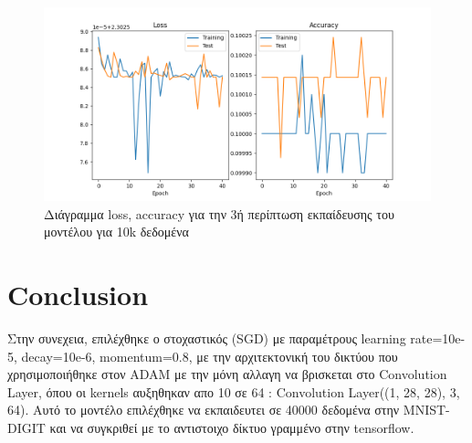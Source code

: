 \begin{figure}[ht]
	\centering
	\includegraphics[width=1\linewidth]{Results/Optimizers/without_dropout_adam_10k.png}
	\caption{ Διάγραμμα loss, accuracy για την 3ή περίπτωση εκπαίδευσης του μοντέλου για 10k δεδομένα}
	\label{f:g8}	
\end{figure}
\clearpage

\section{Conclusion}

Στην συνεχεια, επιλέχθηκε ο στοχαστικός (SGD) με παραμέτρους learning rate=10e-5, decay=10e-6, momentum=0.8, με την αρχιτεκτονική του δικτύου που χρησιμοποιήθηκε στον ADAM με την μόνη αλλαγη να βρισκεται στο Convolution Layer, όπου οι kernels αυξηθηκαν απο 10 σε 64 : Convolution Layer((1, 28, 28), 3, 64). Αυτό το μοντέλο επιλέχθηκε να εκπαιδευτει σε 40000 δεδομένα στην MNIST-DIGIT και να συγκριθεί με το αντιστοιχο δίκτυο γραμμένο στην tensorflow. 

